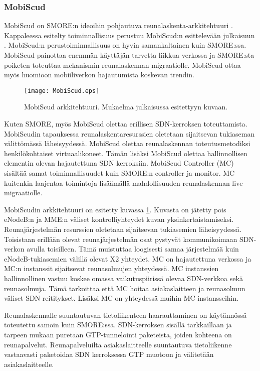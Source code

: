 \subsubsection{MobiScud} \label{mobiscud}
MobiScud on SMORE:n ideoihin pohjautuva reunalaskenta-arkkitehtuuri \cite{wang2015mobiscud}.
Kappaleessa esitelty toiminnallisuus perustuu MobiScud:n esittelevään julkaisuun \cite{wang2015mobiscud}.
MobiScud:n perustoiminnallisuus on hyvin samankaltainen kuin SMORE:ssa. MobiScud painottaa enemmän käyttäjän tarvetta liikkua verkossa ja SMORE:sta poiketen toteuttaa mekanismin reunalaskennan migraatiolle. 
MobiScud ottaa myös huomioon mobiiliverkon hajautumista koskevan trendin.

\begin{figure}[tb]
\texttt{[image: MobiScud.eps]}
\caption{MobiScud arkkitehtuuri. Mukaelma julkaisussa \cite{wang2015mobiscud}  esitettyyn kuvaan.} \label{fig:mobiscud}
\end{figure}

Kuten SMORE, myös MobiScud olettaa erillisen SDN-kerroksen toteuttamista. MobiScudin tapauksessa reunalaskentaresurssien oletetaan sijaitsevan tukiaseman välittömässä läheisyydessä. 
MobiScud olettaa reunalaskennan toteutusmetodiksi henkilökohtaiset virtuaalikoneet.
Tämän lisäksi MobiScud olettaa hallinnollisen elementin olevan hajautettuna SDN kerroksiin. MobiScud Controller (MC) sisältää samat toiminnallisuudet kuin SMORE:n controller ja monitor. 
MC kuitenkin laajentaa toimintoja lisäämällä mahdollisuuden reunalaskennan live migraatiolle.

MobiScudin arkkitehtuuri on esitetty kuvassa \ref{fig:mobiscud}. Kuvasta on jätetty pois eNodeB:n ja MME:n väliset kontrolliyhteydet kuvan yksinkertaistamiseksi.
Reunajärjestelmän resurssien oletetaan sijaitsevan tukiasemien läheisyydessä.
Toisistaan erillään olevat reunajärjestelmän osat pystyvät kommunikoimaan SDN-verkon avulla toisilleen.
Tämä muistuttaa loogisesti samaa järjestelmää kuin eNodeB-tukiasemien välillä olevat X2 yhteydet.
MC on hajautettuna verkossa ja MC:n instanssit sijaitsevat reunasolmujen yhteydessä.
MC instanssien hallinnollinen vastuu koskee omassa vaikutuspiirissä olevaa SDN-verkkoa sekä reunasolmuja. Tämä tarkoittaa että MC hoitaa asiakaslaitteen ja reunasolmun väliset SDN reititykset. Lisäksi MC on yhteydessä muihin MC instansseihin.

Reunalaskennalle suuntautuvan tietoliikenteen haarauttaminen on käytännössä toteutettu samoin kuin SMORE:ssa.
SDN-kerroksen sisällä tarkkaillaan ja tarpeen mukaan puretaan GTP-tunnelointi paketeista, joiden kohteena on reunapalvelut. Reunapalveluilta asiakaslaitteelle suuntautuva tietoliikenne vastaavasti paketoidaa SDN kerroksessa GTP muotoon ja välitetään asiakaslaitteelle.

